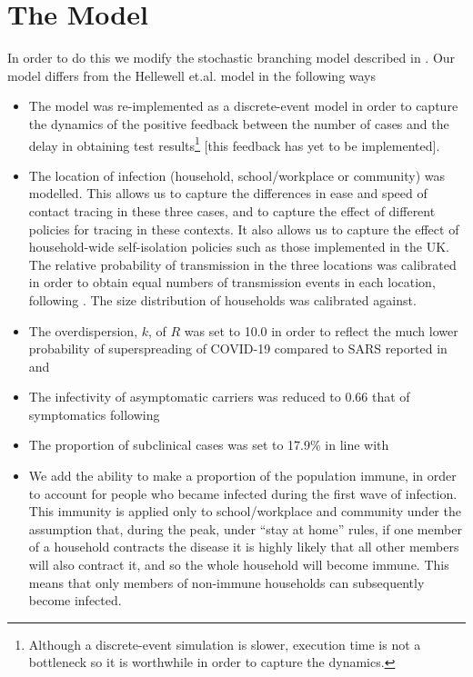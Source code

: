 \documentclass{article}
\begin{document}
\section{The Model}

In order to do this we modify the stochastic branching model described in \cite{hellewellfeasibility}. Our model differs from the Hellewell et.al. model in the following ways
\begin{itemize}

\item The model was re-implemented as a discrete-event model in order to capture the dynamics of the positive feedback between the number of cases and the delay in obtaining test results\footnote{Although a discrete-event simulation is slower, execution time is not a bottleneck so it is worthwhile in order to capture the dynamics.} [this feedback has yet to be implemented].

\item The location of infection (household, school/workplace or community) was modelled. This allows us to capture the differences in ease and speed of contact tracing in these three cases, and to capture the effect of different policies for tracing in these contexts. It also allows us to capture the effect of household-wide self-isolation policies such as those implemented in the UK. The relative probability of transmission in the three locations was calibrated in order to obtain equal numbers of transmission events in each location, following \cite{ferguson2020impact}. The size distribution of households was calibrated against\cite{smithHouseholds}.

\item The overdispersion, $k$, of $R$ was set to 10.0 in order to reflect the much lower probability of superspreading of COVID-19 compared to SARS reported in \cite{zhuang2020preliminary} and \cite{riou2020pattern}

\item The infectivity of asymptomatic carriers was reduced to 0.66 that of symptomatics following \cite{ferguson2020impact}

\item The proportion of subclinical cases was set to 17.9\% in line with \cite{:/content/10.2807/1560-7917.ES.2020.25.10.2000180} 

\item We add the ability to make a proportion of the population immune, in order to account for people who became infected during the first wave of infection. This immunity is applied only to school/workplace and community under the assumption that, during the peak, under ``stay at home'' rules, if one member of a household contracts the disease it is highly likely that all other members will also contract it, and so the whole household will become immune. This means that only members of non-immune households can subsequently become infected.

\end{itemize}
\end{document}
